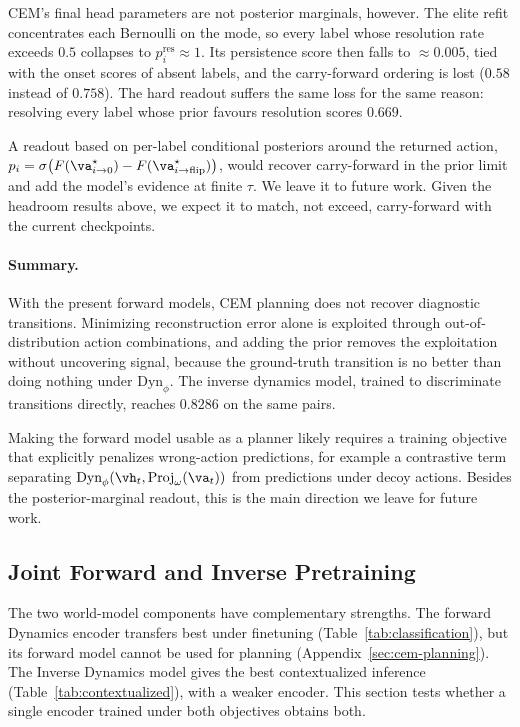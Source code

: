 CEM's final head parameters are not posterior marginals, however. The elite refit concentrates each Bernoulli on the mode, so every label whose resolution rate exceeds $0.5$ collapses to $p^{\text{res}}_i\approx1$. Its persistence score then falls to $\approx0.005$, tied with the onset scores of absent labels, and the carry-forward ordering is lost ($0.58$ instead of $0.758$). The hard readout suffers the same loss for the same reason: resolving every label whose prior favours resolution scores $0.669$.

A readout based on per-label conditional posteriors around the returned action, $p_i=\sigma\big(F(\va^\star_{i\to0})-F(\va^\star_{i\to\text{flip}})\big)$, would recover carry-forward in the prior limit and add the model's evidence at finite $\tau$. We leave it to future work. Given the headroom results above, we expect it to match, not exceed, carry-forward with the current checkpoints.

\paragraph{Summary.} With the present forward models, CEM planning does not recover diagnostic transitions. Minimizing reconstruction error alone is exploited through out-of-distribution action combinations, and adding the prior removes the exploitation without uncovering signal, because the ground-truth transition is no better than doing nothing under $\text{Dyn}_\phi$. The inverse dynamics model, trained to discriminate transitions directly, reaches $0.8286$ on the same pairs.

Making the forward model usable as a planner likely requires a training objective that explicitly penalizes wrong-action predictions, for example a contrastive term separating $\text{Dyn}_\phi(\vh_t,\text{Proj}_\omega(\va_t))$ from predictions under decoy actions. Besides the posterior-marginal readout, this is the main direction we leave for future work.

\subsection{Joint Forward and Inverse Pretraining}
\label{sec:joint-pretraining}

The two world-model components have complementary strengths. The forward Dynamics encoder transfers best under finetuning (Table~\ref{tab:classification}), but its forward model cannot be used for planning (Appendix~\ref{sec:cem-planning}). The Inverse Dynamics model gives the best contextualized inference (Table~\ref{tab:contextualized}), with a weaker encoder. This section tests whether a single encoder trained under both objectives obtains both.

